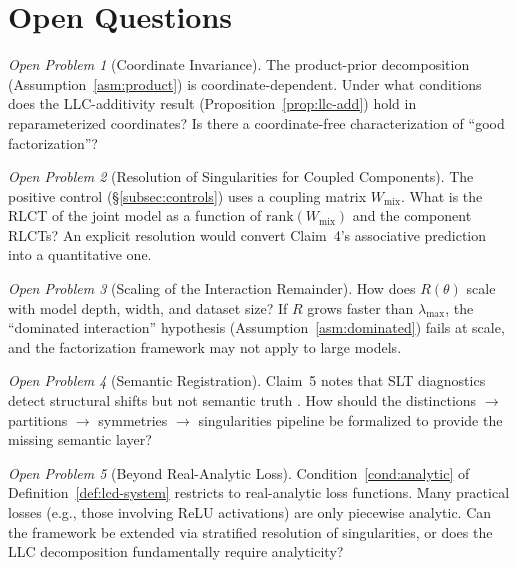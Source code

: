 \documentclass[11pt,a4paper]{article}
\theoremstyle{definition}
\theoremstyle{remark}
\newtheorem{openproblem}{Open Problem}
\newcommand{\LLC}{\lambda}
\begin{document}
\section{Open Questions}\label{sec:open}

\begin{openproblem}[Coordinate Invariance]
  The product-prior decomposition (Assumption~\ref{asm:product}) is
  coordinate-dependent.  Under what conditions does the LLC-additivity result
  (Proposition~\ref{prop:llc-add}) hold in reparameterized coordinates?  Is
  there a coordinate-free characterization of ``good factorization''?
\end{openproblem}

\begin{openproblem}[Resolution of Singularities for Coupled Components]
  The positive control (\S\ref{subsec:controls}) uses a coupling matrix
  $W_{\mathrm{mix}}$.  What is the RLCT of the joint model as a function of
  $\mathrm{rank}(W_{\mathrm{mix}})$ and the component RLCTs?  An explicit
  resolution would convert Claim~4's associative prediction into a quantitative
  one.
\end{openproblem}

\begin{openproblem}[Scaling of the Interaction Remainder]
  How does $R(\theta)$ scale with model depth, width, and dataset size?  If $R$
  grows faster than $\LLC_{\max}$, the ``dominated interaction'' hypothesis
  (Assumption~\ref{asm:dominated}) fails at scale, and the factorization
  framework may not apply to large models.
\end{openproblem}

\begin{openproblem}[Semantic Registration]
  Claim~5 notes that SLT diagnostics detect structural shifts but not semantic
  truth \cite{SLT-GoalStab}.  How should the distinctions $\to$ partitions
  $\to$ symmetries $\to$ singularities pipeline \cite{SLT-Semantics} be
  formalized to provide the missing semantic layer?
\end{openproblem}

\begin{openproblem}[Beyond Real-Analytic Loss]
  Condition~\ref{cond:analytic} of Definition~\ref{def:lcd-system} restricts
  to real-analytic loss functions.  Many practical losses (e.g., those involving
  ReLU activations) are only piecewise analytic.  Can the framework be extended
  via stratified resolution of singularities, or does the LLC decomposition
  fundamentally require analyticity?
\end{openproblem}
\end{document}
